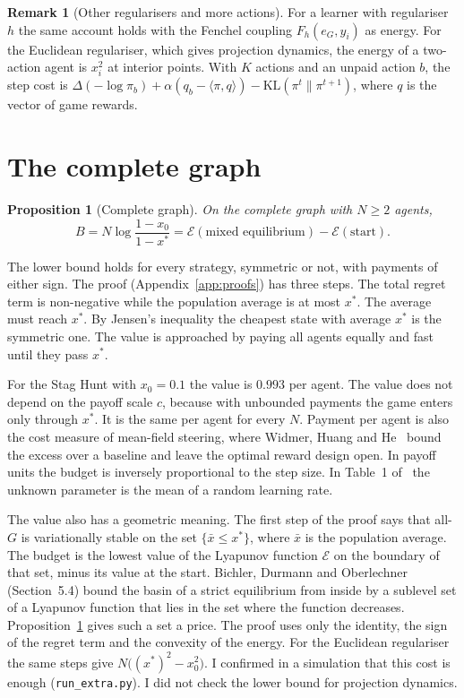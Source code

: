 \documentclass[11pt,a4paper]{article}
\theoremstyle{definition}
\newtheorem{remark}{Remark}
\theoremstyle{plain}
\newtheorem{proposition}{Proposition}
\newcommand{\Binf}{B}
\newcommand{\xs}{x^{*}}
\newcommand{\KL}{\mathrm{KL}}
\newcommand{\En}{\mathcal{E}}
\begin{document}
\begin{remark}[Other regularisers and more actions]\label{rem:other}
For a learner with regulariser $h$ the same account holds with the Fenchel coupling $F_h(e_G,y_i)$ as energy. For the Euclidean regulariser, which gives projection dynamics, the energy of a two-action agent is $x_i^2$ at interior points. With $K$ actions and an unpaid action $b$, the step cost is $\Delta(-\log\pi_b)+\alpha(q_b-\langle\pi,q\rangle)-\KL(\pi^t\|\pi^{t+1})$, where $q$ is the vector of game rewards.
\end{remark}

\section{The complete graph}\label{sec:complete}

\begin{proposition}[Complete graph]\label{prop:complete}
On the complete graph with $N\ge2$ agents,
\[
\Binf=N\log\frac{1-x_0}{1-\xs}=\En(\text{mixed equilibrium})-\En(\text{start}).
\]
\end{proposition}

The lower bound holds for every strategy, symmetric or not, with payments of either sign. The proof (Appendix~\ref{app:proofs}) has three steps. The total regret term is non-negative while the population average is at most $\xs$. The average must reach $\xs$. By Jensen's inequality the cheapest state with average $\xs$ is the symmetric one. The value is approached by paying all agents equally and fast until they pass $\xs$.

For the Stag Hunt with $x_0=0.1$ the value is $0.993$ per agent. The value does not depend on the payoff scale $c$, because with unbounded payments the game enters only through $\xs$. It is the same per agent for every $N$. Payment per agent is also the cost measure of mean-field steering, where Widmer, Huang and He~\cite{widmer2025} bound the excess over a baseline and leave the optimal reward design open. In payoff units the budget is inversely proportional to the step size. In Table~1 of~\cite{huang2025} the unknown parameter is the mean of a random learning rate.

The value also has a geometric meaning. The first step of the proof says that all-$G$ is variationally stable on the set $\{\bar x\le\xs\}$, where $\bar x$ is the population average. The budget is the lowest value of the Lyapunov function $\En$ on the boundary of that set, minus its value at the start. Bichler, Durmann and Oberlechner~\cite{bichler2025b} (Section~5.4) bound the basin of a strict equilibrium from inside by a sublevel set of a Lyapunov function that lies in the set where the function decreases. Proposition~\ref{prop:complete} gives such a set a price. The proof uses only the identity, the sign of the regret term and the convexity of the energy. For the Euclidean regulariser the same steps give $N\bigl((\xs)^{2}-x_0^{2}\bigr)$. I confirmed in a simulation that this cost is enough (\texttt{run\_extra.py}). I did not check the lower bound for projection dynamics.
\end{document}
